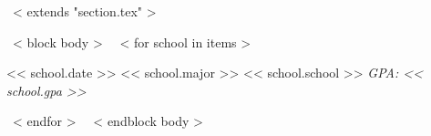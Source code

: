 ~< extends "section.tex" >~

~< block body >~
  ~< for school in items >~
    \begin{samepage}
      \cventry
        {<< school.date >>}
        {<< school.major >>}
        {<< school.school >>}
        {}
        {\textit{GPA: << school.gpa >>}}
        {}
    \end{samepage}
  ~< endfor >~
~< endblock body >~
